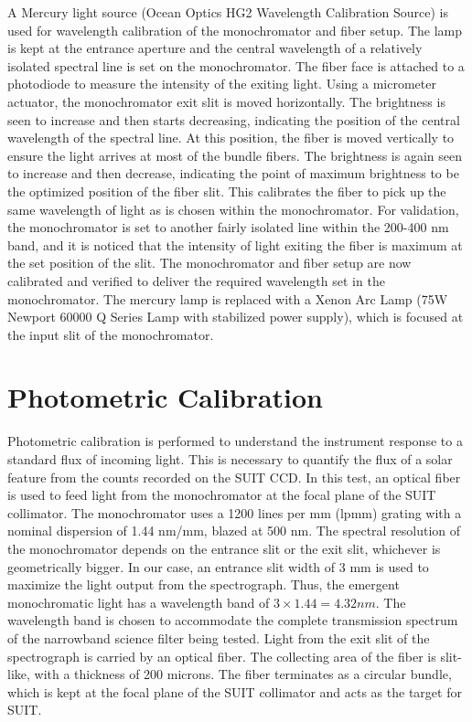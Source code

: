 \documentclass[12pt]{spieman}  %
\begin{document}
A Mercury light source (Ocean Optics HG2 Wavelength Calibration Source) is used for wavelength calibration of the monochromator and fiber setup. The lamp is kept at the entrance aperture and the central wavelength of a relatively isolated spectral line is set on the monochromator. The fiber face is attached to a photodiode to measure the intensity of the exiting light. Using a micrometer actuator, the monochromator exit slit is moved horizontally. The brightness is seen to increase and then starts decreasing, indicating the position of the central wavelength of the spectral line. At this position, the fiber is moved vertically to ensure the light arrives at most of the bundle fibers. The brightness is again seen to increase and then decrease, indicating the point of maximum brightness to be the optimized position of the fiber slit. This calibrates the fiber to pick up the same wavelength of light as is chosen within the monochromator. For validation, the monochromator is set to another fairly isolated line within the 200-400 nm band, and it is noticed that the intensity of light exiting the fiber is maximum at the set position of the slit. The monochromator and fiber setup are now calibrated and verified to deliver the required wavelength set in the monochromator. The mercury lamp is replaced with a Xenon Arc Lamp (75W Newport 60000 Q Series Lamp with stabilized power supply), which is focused at the input slit of the monochromator.
 
\section{Photometric Calibration}
Photometric calibration is performed to understand the instrument response to a standard flux of incoming light. This is necessary to quantify the flux of a solar feature from the counts recorded on the SUIT CCD. In this test, an optical fiber is used to feed light from the monochromator at the focal plane of the SUIT collimator. The monochromator uses a 1200 lines per mm (lpmm) grating with a nominal dispersion of 1.44 nm/mm, blazed at 500 nm. The spectral resolution of the monochromator depends on the entrance slit or the exit slit, whichever is geometrically bigger. In our case, an entrance slit width of 3 mm is used to maximize the light output from the spectrograph. Thus, the emergent monochromatic light has a wavelength band of $3\times 1.44 = 4.32 nm$. The wavelength band is chosen to accommodate the complete transmission spectrum of the narrowband science filter being tested. Light from the exit slit of the spectrograph is carried by an optical fiber. The collecting area of the fiber is slit-like, with a thickness of 200 microns. The fiber terminates as a circular bundle, which is kept at the focal plane of the SUIT collimator and acts as the target for SUIT.
	
\end{document}
